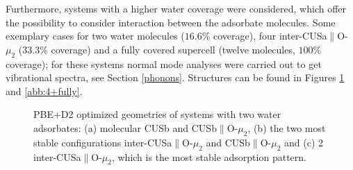 \documentclass[11pt,DIV=13,BCOR=5mm,a4paper,headinclude]{scrbook}
\begin{document}
Furthermore, systems with a higher water coverage were considered, which offer the possibility to consider interaction between the adsorbate molecules. Some exemplary cases for two water molecules ($16.6\%$ coverage), four inter-CUSa$\parallel$O-$\mu_2$ ($33.3\%$ coverage) and a fully covered supercell (twelve molecules, $100\%$ coverage); for these systems normal mode analyses were carried out to get vibrational spectra, see Section \ref{phonons}.
Structures can be found in Figures \ref{abb:2water} and \ref{abb:4+fully}.
\begin{figure}[!ht]
 \centering
{}
 \quad\quad
  \quad
{}
 \quad
 \caption{PBE+D2 optimized geometries of systems with two water adsorbates: (a) molecular CUSb and CUSb$\parallel$O-$\mu_2$, (b) the two most stable configurations inter-CUSa$\parallel$O-$\mu_2$ and CUSb$\parallel$O-$\mu_2$ and (c) 2 inter-CUSa$\parallel$O-$\mu_2$, which is the most stable adsorption pattern.}
        \label{abb:2water}
 \end{figure}
\end{document}
